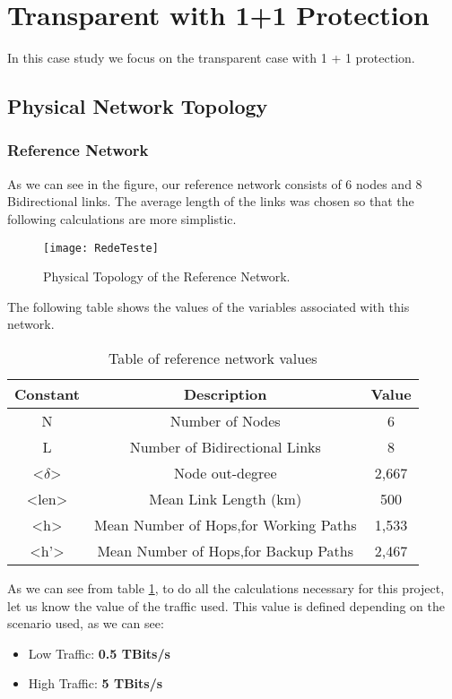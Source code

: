 \clearpage

\section{Transparent with 1+1 Protection}
In this case study we focus on the transparent case with 1 + 1 protection.

\subsection{Physical Network Topology}

\subsubsection{Reference Network}
As we can see in the figure, our reference network consists of 6 nodes and 8 Bidirectional links.
The average length of the links was chosen so that the following calculations are more simplistic.

\begin{figure}[h!]
\centering
\texttt{[image: RedeTeste]}
\caption{Physical Topology of the Reference Network.}
\end{figure}

The following table shows the values of the variables associated with this network.
\begin{table}[h!]
\centering
\begin{tabular}{|| c | c | c||}
 \hline
 Constant & Description & Value \\
 \hline\hline
 N & Number of Nodes & 6 \\
 L & Number of Bidirectional Links & 8 \\
 <$\delta$> & Node out-degree & 2,667 \\
 <len> & Mean Link Length (km) & 500 \\
 <h> & Mean Number of Hops,for Working Paths & 1,533 \\
 <h'> & Mean Number of Hops,for Backup Paths & 2,467 \\
 \hline
\end{tabular}
\caption{Table of reference network values}
\label{table:1}
\end{table}

As we can see from table \ref{table:1}, to do all the calculations necessary for this project, let us know the value of the traffic used. This value is defined depending on the scenario used, as we can see:
\begin{itemize}
  \item Low Traffic: \textbf{0.5 TBits/s}
  \item High Traffic: \textbf{5 TBits/s}
\end{itemize}

